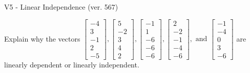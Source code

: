 \begin{exercise}
  \begin{exerciseTitle}V5 - Linear Independence (ver. 567)\end{exerciseTitle}
  \begin{exerciseStatement}
    Explain why the vectors \(\left[\begin{array}{r}
-4 \\
3 \\
-1 \\
2 \\
-5
\end{array}\right] , \left[\begin{array}{r}
5 \\
-2 \\
3 \\
4 \\
2
\end{array}\right] , \left[\begin{array}{r}
-1 \\
1 \\
-6 \\
-6 \\
-6
\end{array}\right] , \left[\begin{array}{r}
2 \\
-2 \\
-1 \\
-4 \\
-6
\end{array}\right] , \text{ and } \left[\begin{array}{r}
-1 \\
-4 \\
0 \\
3 \\
-6
\end{array}\right]\) are linearly dependent or linearly independent.	



\end{exerciseStatement}
\end{exercise}

